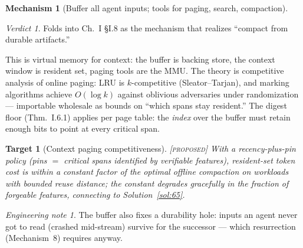 \documentclass[11pt,a4paper]{article}
\newtheorem{target}{Target}[section]
\theoremstyle{definition}
\newtheorem{mech}{Mechanism}
\theoremstyle{remark}
\newtheorem*{verdict}{Verdict}
\newtheorem*{note}{Engineering note}
\newcommand{\grade}[1]{\textsc{[#1]}}
\begin{document}
\begin{mech}[Buffer all agent inputs; tools for paging, search, compaction]
\begin{verdict} Folds into Ch.~I \S I.8 as the mechanism that realizes ``compact from durable artifacts.'' \end{verdict}
This is virtual memory for context: the buffer is backing store, the context window is resident set, paging tools are the MMU. The theory is competitive analysis of online paging: LRU is $k$-competitive (Sleator--Tarjan), and marking algorithms achieve $O(\log k)$ against oblivious adversaries under randomization --- importable wholesale as bounds on ``which spans stay resident.'' The digest floor (Thm.~I.6.1) applies per page table: the \emph{index} over the buffer must retain enough bits to point at every critical span.
\begin{target}[Context paging competitiveness]\grade{proposed} With a recency-plus-pin policy (pins $=$ critical spans identified by verifiable features), resident-set token cost is within a constant factor of the optimal offline compaction on workloads with bounded reuse distance; the constant degrades gracefully in the fraction of forgeable features, connecting to Solution~\ref{sol:65}. \end{target}
\begin{note} The buffer also fixes a durability hole: inputs an agent never got to read (crashed mid-stream) survive for the successor --- which resurrection (Mechanism~8) requires anyway. \end{note}
\end{mech}
\end{document}
